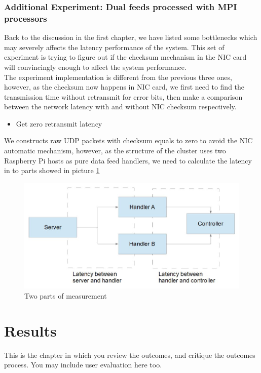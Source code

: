 \documentclass[11pt,openright,a4paper]{report}
\begin{document}
\subsection{Additional Experiment: Dual feeds processed with MPI processors}
Back to the discussion in the first chapter, we have listed some bottlenecks which may severely affects the latency performance of the system. This set of experiment is trying to figure out if the checksum mechanism in the NIC card will convincingly enough to affect the system performance.\\
The experiment implementation is different from the previous three ones, however, as the checksum now happens in NIC card, we first need to find the transmission time without retransmit for error bits, then make a comparison between the network latency with and without NIC checksum respectively.\\
\begin{itemize}
	\item[1.] Get zero retransmit latency
\end{itemize}
We constructs raw UDP packets with checksum equals to zero to avoid the NIC automatic mechanism, however, as the structure of the cluster uses two Raspberry Pi hosts as pure data feed handlers, we need to calculate the latency in to parts showed in picture \ref{fig:addExperi}
\begin{figure}[H]
\centering
\includegraphics[width=0.7\linewidth]{picture/addExperi}
\caption{Two parts of measurement}
\label{fig:addExperi}
\end{figure}

\chapter{Results}
This is the chapter in which you review the outcomes, and
critique the outcomes process.  You may include user evaluation here
too.


\end{document}

